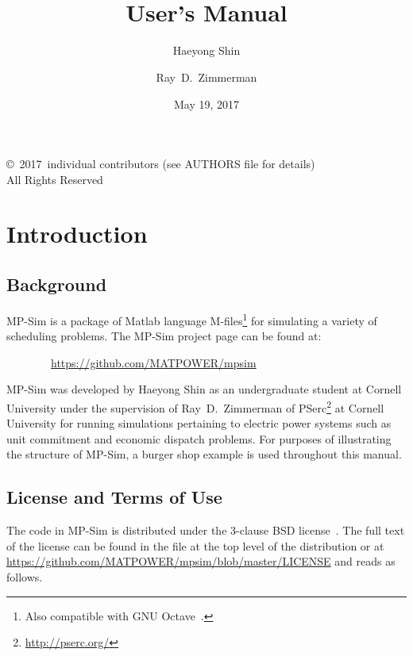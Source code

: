 \documentclass[12pt]{article}
\title{\mpsim{} \mpsimver{}\\
User's Manual}
\author{Haeyong Shin \and Ray~D.~Zimmerman}
\date{May 19, 2017} %
\newcommand{\matlab}[0]{{\sc Matlab}}
\newcommand{\mpsim}[0]{{MP-Sim}}
\newcommand{\mpsimurl}[0]{https://github.com/MATPOWER/mpsim}
\newcommand{\pserc}[0]{{\sc PSerc}}
\newcommand{\code}[1]{{\relsize{-0.5}{\tt{{#1}}}}}  %
\numberwithin{equation}{section}
\numberwithin{table}{section}
\numberwithin{figure}{section}
\begin{document}
\maketitle
\thispagestyle{empty}
\vfill
\begin{center}
{\scriptsize
\copyright~2017~individual contributors (see AUTHORS file for details)\\
All Rights Reserved}
\end{center}

\clearpage
\tableofcontents
\clearpage
\listoffigures
\listoftables

\clearpage
\section{Introduction}

\subsection{Background}

\mpsim{} is a package of \matlab{} language M-files\footnote{Also compatible with GNU Octave~\cite{octave}.} for simulating a variety of scheduling problems. The \mpsim{} project page can be found at:

\bigskip

~~~~~~~~\url{\mpsimurl}

\bigskip

\mpsim{} was developed by Haeyong Shin as an undergraduate student at Cornell University under the supervision of Ray~D.~Zimmerman of \pserc{}\footnote{\url{http://pserc.org/}} at Cornell University for running simulations pertaining to electric power systems such as unit commitment and economic dispatch problems.  For purposes of illustrating the structure of \mpsim{}, a burger shop example is used throughout this manual.

\clearpage
\subsection{License and Terms of Use}

The code in \mpsim{} is distributed under the 3-clause BSD license~\cite{bsd}. The full text of the license can be found in the \code{LICENSE} file at the top level of the distribution or at \url{https://github.com/MATPOWER/mpsim/blob/master/LICENSE} and reads as follows.
\end{document}
